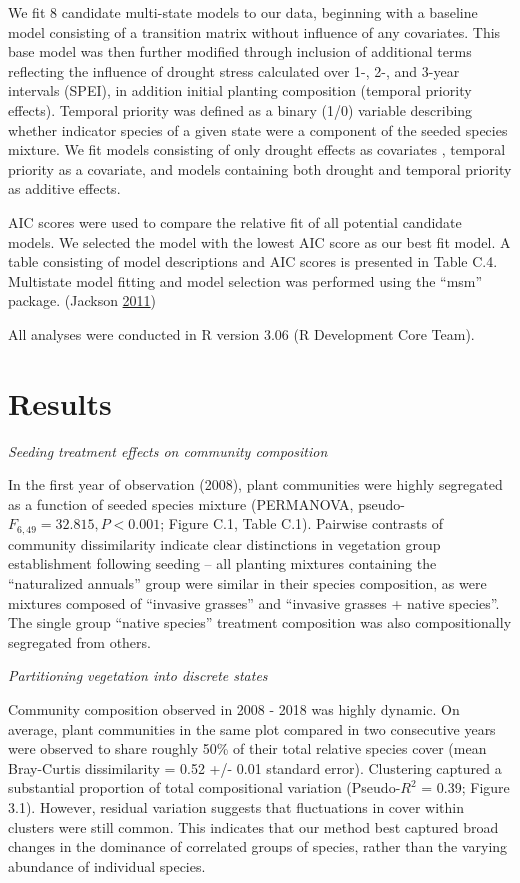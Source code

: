 \documentclass[twoside,12pt,final]{ucthesis-CA2012}
\begin{document}
\begin{ucmainmatter}
We fit 8 candidate multi-state models to our data, beginning with a baseline model consisting of a transition matrix without influence of any covariates.
This base model was then further modified through inclusion of additional terms reflecting the influence of drought stress calculated over 1-, 2-, and 3-year intervals (SPEI), in addition initial planting composition (temporal priority effects).
Temporal priority was defined as a binary (1/0) variable describing whether indicator species of a given state were a component of the seeded species mixture.
We fit models consisting of only drought effects as covariates , temporal priority as a covariate, and models containing both drought and temporal priority as additive effects.

AIC scores were used to compare the relative fit of all potential candidate models. We selected the model with the lowest AIC score as our best fit model.
A table consisting of model descriptions and AIC scores is presented in Table C.4. Multistate model fitting and model selection was performed using the ``msm'' package. (Jackson \protect\hyperlink{ref-Jackson2011}{2011})

All analyses were conducted in R version 3.06 (R Development Core Team).

\hypertarget{results}{%
\section{Results}\label{results}}

\emph{Seeding treatment effects on community composition}

In the first year of observation (2008), plant communities were highly segregated as a function of seeded species mixture (PERMANOVA, pseudo-\(F_{6, 49} = 32.815, P < 0.001\); Figure C.1, Table C.1).
Pairwise contrasts of community dissimilarity indicate clear distinctions in vegetation group establishment following seeding -- all planting mixtures containing the ``naturalized annuals'' group were similar in their species composition, as were mixtures composed of ``invasive grasses'' and ``invasive grasses + native species''.
The single group ``native species'' treatment composition was also compositionally segregated from others.

\emph{Partitioning vegetation into discrete states}

Community composition observed in 2008 - 2018 was highly dynamic.
On average, plant communities in the same plot compared in two consecutive years were observed to share roughly 50\% of their total relative species cover (mean Bray-Curtis dissimilarity = 0.52 +/- 0.01 standard error).
Clustering captured a substantial proportion of total compositional variation (Pseudo-\(R^2\) = 0.39; Figure 3.1).
However, residual variation suggests that fluctuations in cover within clusters were still common.
This indicates that our method best captured broad changes in the dominance of correlated groups of species, rather than the varying abundance of individual species.


\end{ucmainmatter}
\end{document}

